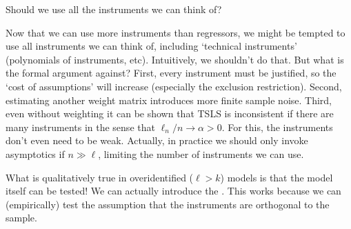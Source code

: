 \documentclass[10pt]{article}
\begin{document}
\begin{question}
	Should we use all the instruments we can think of?
\end{question}
Now that we can use more instruments than regressors, we might be tempted to use all instruments we can think of, including `technical instruments' (polynomials of instruments, etc). Intuitively, we shouldn't do that. But what is the formal argument against? First, every instrument must be justified, so the 	`cost of assumptions' will increase (especially the exclusion restriction). Second, estimating another weight matrix introduces more finite sample noise. Third, even without weighting it can be shown that TSLS is inconsistent if there are many instruments in the sense that $\ell_n / n \to \alpha > 0$. For this, the instruments don't even need to be weak. Actually, in practice we should only invoke asymptotics if $n \gg \ell$, limiting the number of instruments we can use.


\begin{definition}
	What is qualitatively true in overidentified ($\ell > k$) models is that the model itself can be tested! We can actually introduce the . This works because we can (empirically) test the assumption that the instruments are orthogonal to the sample.
\end{definition}
\end{document}
